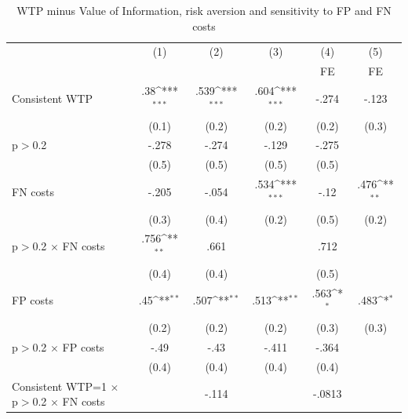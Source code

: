 \begin{table}[htbp]\centering
\def\sym#1{\ifmmode^{#1}\else\(^{#1}\)\fi}
\caption{WTP minus Value of Information, risk aversion and sensitivity to FP and FN costs}
\begin{tabular}{l*{5}{c}}
\hline\hline
                &\multicolumn{1}{c}{(1)}&\multicolumn{1}{c}{(2)}&\multicolumn{1}{c}{(3)}&\multicolumn{1}{c}{(4)}&\multicolumn{1}{c}{(5)}\\
                &\multicolumn{1}{c}{}&\multicolumn{1}{c}{}&\multicolumn{1}{c}{}&\multicolumn{1}{c}{FE}&\multicolumn{1}{c}{FE}\\
\hline
Consistent WTP  &      .38\sym{***}&     .539\sym{***}&     .604\sym{***}&    -.274         &    -.123         \\
                &    (0.1)         &    (0.2)         &    (0.2)         &    (0.2)         &    (0.3)         \\
p$>$0.2         &    -.278         &    -.274         &    -.129         &    -.275         &                  \\
                &    (0.5)         &    (0.5)         &    (0.5)         &    (0.5)         &                  \\
FN costs        &    -.205         &    -.054         &     .534\sym{***}&     -.12         &     .476\sym{**} \\
                &    (0.3)         &    (0.4)         &    (0.2)         &    (0.5)         &    (0.2)         \\
p$>$0.2 $\times$ FN costs&     .756\sym{**} &     .661         &                  &     .712         &                  \\
                &    (0.4)         &    (0.4)         &                  &    (0.5)         &                  \\
FP costs        &      .45\sym{**} &     .507\sym{**} &     .513\sym{**} &     .563\sym{*}  &     .483\sym{*}  \\
                &    (0.2)         &    (0.2)         &    (0.2)         &    (0.3)         &    (0.3)         \\
p$>$0.2 $\times$ FP costs&     -.49         &     -.43         &    -.411         &    -.364         &                  \\
                &    (0.4)         &    (0.4)         &    (0.4)         &    (0.4)         &                  \\
Consistent WTP=1 $\times$ p$>$0.2 $\times$ FN costs&                  &    -.114         &                  &   -.0813         &                  \\

\end{tabular}
\end{table}
